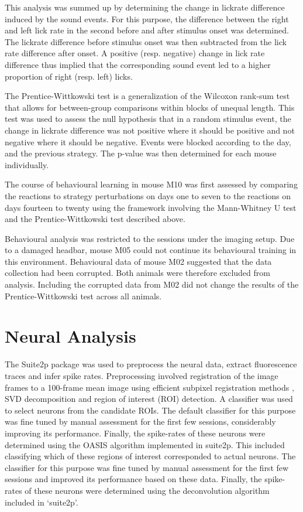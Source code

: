 \documentclass[]{report}
\theoremstyle{definition}
\theoremstyle{definition}
\theoremstyle{definition}
\theoremstyle{remark}
\begin{document}
This analysis was summed up by determining the change in lickrate
difference induced by the sound events. For this purpose, the difference
between the right and left lick rate in the second before and after
stimulus onset was determined. The lickrate difference before stimulus
onset was then subtracted from the lick rate difference after onset. A
positive (resp. negative) change in lick rate difference thus implied
that the corresponding sound event led to a higher proportion of right
(resp. left) licks.

The Prentice-Wittkowski test
\citep{prentice1979test, wittkowski2007test} is a generalization of the
Wilcoxon rank-sum test that allows for between-group comparisons within
blocks of unequal length. This test was used to assess the null
hypothesis that in a random stimulus event, the change in lickrate
difference was not positive where it should be positive and not negative
where it should be negative. Events were blocked according to the day,
and the previous strategy. The p-value was then determined for each
mouse individually.

The course of behavioural learning in mouse M10 was first assessed by
comparing the reactions to strategy perturbations on days one to seven
to the reactions on days fourteen to twenty using the framework
involving the Mann-Whitney U test and the Prentice-Wittkowski test
described above.

Behavioural analysis was restricted to the sessions under the imaging
setup. Due to a damaged headbar, mouse M05 could not continue its
behavioural training in this environment. Behavioural data of mouse M02
suggested that the data collection had been corrupted. Both animals were
therefore excluded from analysis. Including the corrupted data from M02
did not change the results of the Prentice-Wittkowski test across all
animals.

\hypertarget{neural-analysis}{%
\section{Neural Analysis}\label{neural-analysis}}

The Suite2p package \citep{pachitariu2017suite2p} was used to preprocess
the neural data, extract fluorescence traces and infer spike rates.
Preprocessing involved registration of the image frames to a 100-frame
mean image using efficient subpixel registration methods
\citep{guizar2008subpixel}, SVD decomposition and region of interest
(ROI) detection. A classifier was used to select neurons from the
candidate ROIs. The default classifier for this purpose was fine tuned
by manual assessment for the first few sessions, considerably improving
its performance. Finally, the spike-rates of these neurons were
determined using the OASIS algorithm implemented in suite2p. This
included classifying which of these regions of interest corresponded to
actual neurons. The classifier for this purpose was fine tuned by manual
assessment for the first few sessions and improved its performance based
on these data. Finally, the spike-rates of these neurons were determined
using the deconvolution algorithm included in `suite2p'.
\end{document}
